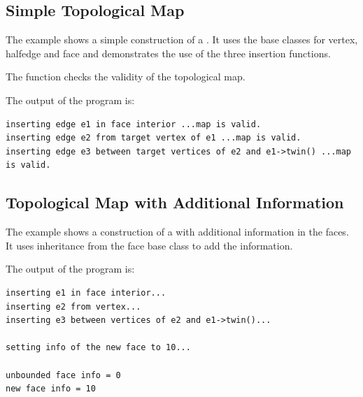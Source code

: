 \subsection{Simple Topological Map}
The example shows a simple construction of a .
It uses the base classes for vertex, halfedge and face and demonstrates
the use of the three insertion functions.

The function  checks the validity of the topological map.


The output of the program is:

\begin{verbatim}
inserting edge e1 in face interior ...map is valid.
inserting edge e2 from target vertex of e1 ...map is valid.
inserting edge e3 between target vertices of e2 and e1->twin() ...map is valid.

\end{verbatim}


\subsection{Topological Map with Additional Information}
The example shows a construction of a 
with additional information in the faces. It uses inheritance from the face 
base class to add the information. 


The output of the program is:

\begin{verbatim}
inserting e1 in face interior...
inserting e2 from vertex...
inserting e3 between vertices of e2 and e1->twin()...

setting info of the new face to 10...

unbounded face info = 0
new face info = 10
\end{verbatim}


